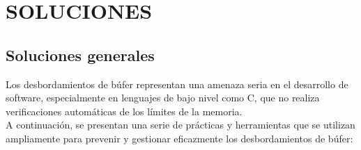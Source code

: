 \chapter{SOLUCIONES}

\section{Soluciones generales}
\noindent Los desbordamientos de búfer representan una amenaza seria en el desarrollo de software, especialmente en lenguajes de bajo nivel como C, que no realiza verificaciones automáticas de los límites de la memoria. 
\\
A continuación, se presentan una serie de prácticas y herramientas que se utilizan ampliamente para prevenir y gestionar eficazmente los desbordamientos de búfer:

